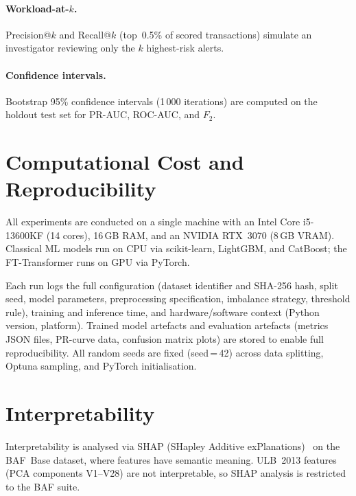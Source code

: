 \paragraph{Workload-at-\texorpdfstring{$k$}{k}.}
Precision@$k$ and Recall@$k$ (top~0.5\% of scored transactions) simulate an investigator reviewing only the $k$ highest-risk alerts.

\paragraph{Confidence intervals.}
Bootstrap 95\% confidence intervals (1\,000 iterations) are computed on the holdout test set for PR-AUC, ROC-AUC, and $F_2$.

\section{Computational Cost and Reproducibility}
\label{sec:reproducibility}

All experiments are conducted on a single machine with an Intel Core i5-13600KF (14 cores), 16\,GB RAM, and an NVIDIA RTX~3070 (8\,GB VRAM). Classical ML models run on CPU via scikit-learn, LightGBM, and CatBoost; the FT-Transformer runs on GPU via PyTorch.

Each run logs the full configuration (dataset identifier and SHA-256 hash, split seed, model parameters, preprocessing specification, imbalance strategy, threshold rule), training and inference time, and hardware/software context (Python version, platform). Trained model artefacts and evaluation artefacts (metrics JSON files, PR-curve data, confusion matrix plots) are stored to enable full reproducibility. All random seeds are fixed (seed\,=\,42) across data splitting, Optuna sampling, and PyTorch initialisation.

\section{Interpretability}
\label{sec:interpretability}

Interpretability is analysed via SHAP (SHapley Additive exPlanations)~\cite{lundberg2017unified} on the BAF~Base dataset, where features have semantic meaning. ULB~2013 features (PCA components V1--V28) are not interpretable, so SHAP analysis is restricted to the BAF suite.


